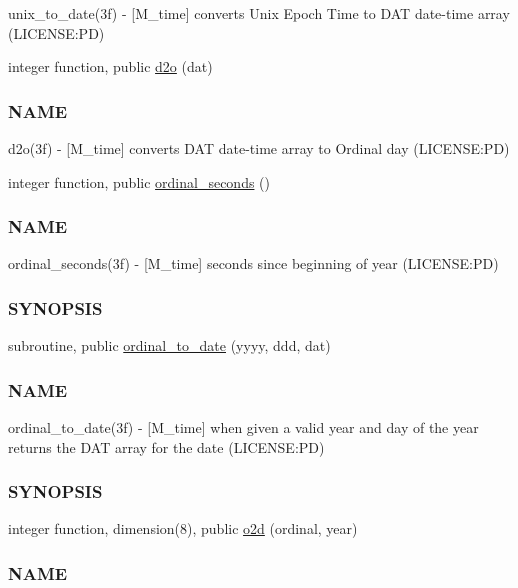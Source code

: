 \begin{DoxyCompactItemize}
\begin{DoxyCompactList}
unix\+\_\+to\+\_\+date(3f) -\/ \mbox{[}M\+\_\+time\mbox{]} converts Unix Epoch Time to D\+AT date-\/time array (L\+I\+C\+E\+N\+SE\+:PD) \end{DoxyCompactList}\item 
integer function, public \mbox{\hyperlink{namespacem__time_a727dd77bbd4a5d0e3947c5d303845947}{d2o}} (dat)
\begin{DoxyCompactList}\small\item\em \subsubsection*{N\+A\+ME}

d2o(3f) -\/ \mbox{[}M\+\_\+time\mbox{]} converts D\+AT date-\/time array to Ordinal day (L\+I\+C\+E\+N\+SE\+:PD) \end{DoxyCompactList}\item 
integer function, public \mbox{\hyperlink{namespacem__time_ab8960d2aa60e134bcf77247d8b257963}{ordinal\+\_\+seconds}} ()
\begin{DoxyCompactList}\small\item\em \subsubsection*{N\+A\+ME}

ordinal\+\_\+seconds(3f) -\/ \mbox{[}M\+\_\+time\mbox{]} seconds since beginning of year (L\+I\+C\+E\+N\+SE\+:PD) \subsubsection*{S\+Y\+N\+O\+P\+S\+IS}\end{DoxyCompactList}\item 
subroutine, public \mbox{\hyperlink{namespacem__time_aa4dca4409bf20a011bb04988c1335d63}{ordinal\+\_\+to\+\_\+date}} (yyyy, ddd, dat)
\begin{DoxyCompactList}\small\item\em \subsubsection*{N\+A\+ME}

ordinal\+\_\+to\+\_\+date(3f) -\/ \mbox{[}M\+\_\+time\mbox{]} when given a valid year and day of the year returns the D\+AT array for the date (L\+I\+C\+E\+N\+SE\+:PD) \subsubsection*{S\+Y\+N\+O\+P\+S\+IS}\end{DoxyCompactList}\item 
integer function, dimension(8), public \mbox{\hyperlink{namespacem__time_a55e2cb9efc9d4d209ae2864f073d4f19}{o2d}} (ordinal, year)
\begin{DoxyCompactList}\small\item\em \subsubsection*{N\+A\+ME}


\end{DoxyCompactList}
\end{DoxyCompactItemize}
